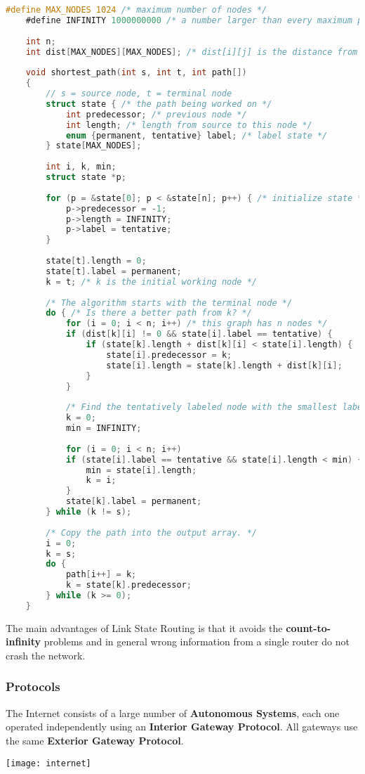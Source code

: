 \begin{lstlisting}[language=C]
	#define MAX_NODES 1024 /* maximum number of nodes */
	#define INFINITY 1000000000 /* a number larger than every maximum path */
	
	int n;
	int dist[MAX_NODES][MAX_NODES]; /* dist[i][j] is the distance from i to j */
	
	void shortest_path(int s, int t, int path[])
	{ 
		// s = source node, t = terminal node 
		struct state { /* the path being worked on */
			int predecessor; /* previous node */
			int length; /* length from source to this node */
			enum {permanent, tentative} label; /* label state */
		} state[MAX_NODES];
		
		int i, k, min;
		struct state *p;
		
		for (p = &state[0]; p < &state[n]; p++) { /* initialize state */
			p->predecessor = -1;
			p->length = INFINITY;
			p->label = tentative;
		}
		
		state[t].length = 0;
		state[t].label = permanent;
		k = t; /* k is the initial working node */
		
		/* The algorithm starts with the terminal node */
		do { /* Is there a better path from k? */
			for (i = 0; i < n; i++) /* this graph has n nodes */
			if (dist[k][i] != 0 && state[i].label == tentative) {
				if (state[k].length + dist[k][i] < state[i].length) {
					state[i].predecessor = k;
					state[i].length = state[k].length + dist[k][i];
				}
			}
			
			/* Find the tentatively labeled node with the smallest label. */
			k = 0;
			min = INFINITY;
			
			for (i = 0; i < n; i++)
			if (state[i].label == tentative && state[i].length < min) {
				min = state[i].length;
				k = i;
			}
			state[k].label = permanent;
		} while (k != s);
		
		/* Copy the path into the output array. */
		i = 0;
		k = s;
		do {
			path[i++] = k;
			k = state[k].predecessor;
		} while (k >= 0);
	}
\end{lstlisting}

The main advantages of Link State Routing is that it avoids the \textbf{count-to-infinity} problems and in general wrong information from a single router do not crash the network.

\subsubsection{Protocols}
The Internet consists of a large number of \textbf{Autonomous Systems}, each one operated independently using an \textbf{Interior Gateway Protocol}. All gateways use the same \textbf{Exterior Gateway Protocol}.
\begin{center}
	\texttt{[image: internet]}
\end{center}

